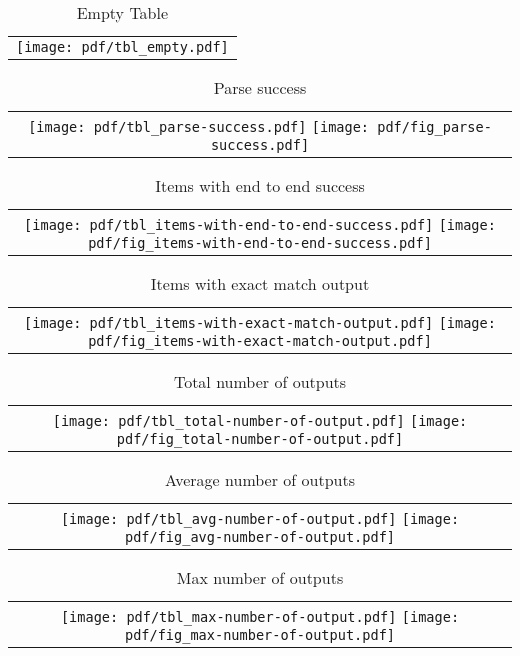 \documentclass{article}
\begin{document}
\begin{table}[!h]
\centering
\begin{tabular}{c}
\texttt{[image: pdf/tbl\_empty.pdf]}
\end{tabular}
\caption{Empty Table}
\end{table}


\begin{table}[!h]
\centering
\begin{tabular}{c}
\texttt{[image: pdf/tbl\_parse-success.pdf]} 
\texttt{[image: pdf/fig\_parse-success.pdf]}
\end{tabular}
\caption{Parse success}
\end{table}


\begin{table}[!h]
\centering
\begin{tabular}{c}
\texttt{[image: pdf/tbl\_items-with-end-to-end-success.pdf]}
\texttt{[image: pdf/fig\_items-with-end-to-end-success.pdf]}
\end{tabular}
\caption{Items with end to end success}
\end{table}


\begin{table}[!h]
\centering
\begin{tabular}{c}
\texttt{[image: pdf/tbl\_items-with-exact-match-output.pdf]}
\texttt{[image: pdf/fig\_items-with-exact-match-output.pdf]}
\end{tabular}
\caption{Items with exact match output}
\end{table}


\begin{table}[!h]
\centering
\begin{tabular}{c}
\texttt{[image: pdf/tbl\_total-number-of-output.pdf]}
\texttt{[image: pdf/fig\_total-number-of-output.pdf]}
\end{tabular}
\caption{Total number of outputs}
\end{table}




\begin{table}[!h]
\centering
\begin{tabular}{c}
\texttt{[image: pdf/tbl\_avg-number-of-output.pdf]}
\texttt{[image: pdf/fig\_avg-number-of-output.pdf]}
\end{tabular}
\caption{Average number of outputs}
\end{table}



\begin{table}[!h]
\centering
\begin{tabular}{c}
\texttt{[image: pdf/tbl\_max-number-of-output.pdf]}
\texttt{[image: pdf/fig\_max-number-of-output.pdf]}
\end{tabular}
\caption{Max number of outputs}
\end{table}
\end{document}
